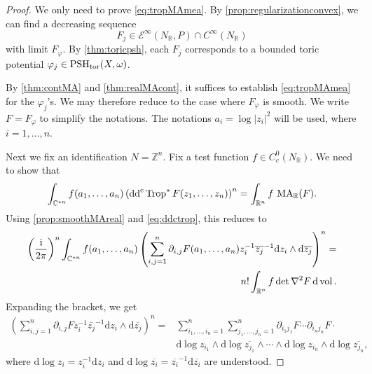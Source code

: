 \begin{proof}
    We only need to prove \eqref{eq:tropMAmea}. By \cref{prop:regularizationconvex}, we can find a decreasing sequence
    \[
        F_j\in \mathcal E^\infty(N_{\mathbb R},P)\cap C^\infty(N_{\mathbb R})
    \]
    with limit $F_\varphi$. By \cref{thm:toricpsh}, each $F_j$ corresponds to a bounded toric potential $\varphi_j\in\mathrm{PSH}_{\mathrm{tor}}(X,\omega)$.

    By \cref{thm:contMA} and \cref{thm:realMAcont}, it suffices to establish \eqref{eq:tropMAmea} for the $\varphi_j$'s. We may therefore reduce to the case where $F_{\varphi}$ is smooth. We write $F=F_{\varphi}$ to simplify the notations. The notations $a_i=\log |z_i|^2$ will be used, where $i=1,\ldots,n$.

    Next we fix an identification $N=\mathbb{Z}^n$. Fix a test function $f\in C^{0}_c(N_{\mathbb{R}})$. We need to show that
    \[
    \int_{\mathbb{C}^{*n}}f(a_1,\ldots,a_n) \left(\mathrm{dd}^{\mathrm{c}} \operatorname{Trop}^* F(z_1,\ldots,z_n)\right)^n=\int_{\mathbb{R}^n} f\,\operatorname{MA}_{\mathbb{R}}(F).
    \]
    Using \cref{prop:smoothMAreal} and \eqref{eq:ddctrop}, this reduces to
    \begin{equation}\label{eq:realcplxMAtemp1}
    \begin{split}
        \left( \frac{\mathrm{i}}{2\pi}\right)^n\int_{\mathbb{C}^{*n}}f(a_1,\ldots,a_n)
        \left(\sum_{i,j=1}^n \partial_{i,j}F(a_1,\ldots,a_n)z_i^{-1}\overline{z_j}^{-1}\mathrm{d}z_i\wedge \mathrm{d}\overline{z_j}\right)^n=\\
        n!\int_{\mathbb{R}^n} f \det \nabla^2 F\,\mathrm{d}\operatorname{vol}.
    \end{split}
    \end{equation}
    Expanding the bracket, we get
    \[
    \begin{aligned}
        \left(\sum_{i,j=1}^n \partial_{i,j}Fz_i^{-1}\overline{z_j}^{-1}\mathrm{d}z_i\wedge \mathrm{d}\overline{z_j}\right)^n
        =& \sum_{i_1,\ldots,i_n=1}^n \sum_{j_1,\ldots,j_n=1}^n \partial_{i_1j_1}F\cdots \partial_{i_nj_n}F\cdot \\
        &\mathrm{d}\log z_{i_1}\wedge \mathrm{d}\log \overline{z_{j_1}}\wedge \cdots\wedge \mathrm{d}\log z_{i_n}\wedge \mathrm{d}\log \overline{z_{j_n}},
    \end{aligned}
    \]
    where $\mathrm{d}\log z_i=z_i^{-1}\mathrm{d}z_i$ and $\mathrm{d}\log \overline{z_i}=\overline{z_i}^{-1}\mathrm{d}\overline{z_i}$ are understood.


\end{proof}

